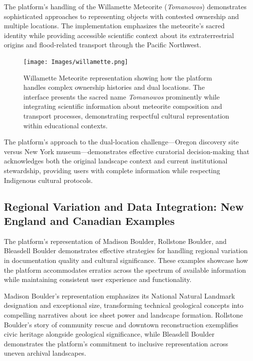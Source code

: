 The platform's handling of the Willamette Meteorite (\emph{Tomanowos}) demonstrates sophisticated approaches to representing objects with contested ownership and multiple locations. The implementation emphasizes the meteorite's sacred identity while providing accessible scientific context about its extraterrestrial origins and flood-related transport through the Pacific Northwest.

\begin{figure}[htbp]
    \centering
    \texttt{[image: Images/willamette.png]}
    \caption{Willamette Meteorite representation showing how the platform handles complex ownership histories and dual locations. The interface presents the sacred name \emph{Tomanowos} prominently while integrating scientific information about meteorite composition and transport processes, demonstrating respectful cultural representation within educational contexts.}
    \label{fig:willamette_meteorite_representation}
\end{figure}

The platform's approach to the dual-location challenge—Oregon discovery site versus New York museum—demonstrates effective curatorial decision-making that acknowledges both the original landscape context and current institutional stewardship, providing users with complete information while respecting Indigenous cultural protocols.

\subsection{Regional Variation and Data Integration: New England and Canadian Examples}
\label{subsec:regional_variation}

The platform's representation of Madison Boulder, Rollstone Boulder, and Bleasdell Boulder demonstrates effective strategies for handling regional variation in documentation quality and cultural significance. These examples showcase how the platform accommodates erratics across the spectrum of available information while maintaining consistent user experience and functionality.

Madison Boulder's representation emphasizes its National Natural Landmark designation and exceptional size, transforming technical geological concepts into compelling narratives about ice sheet power and landscape formation. Rollstone Boulder's story of community rescue and downtown reconstruction exemplifies civic heritage alongside geological significance, while Bleasdell Boulder demonstrates the platform's commitment to inclusive representation across uneven archival landscapes.

